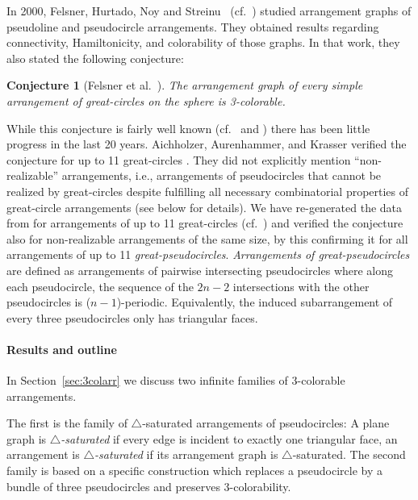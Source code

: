 \documentclass[fontsize=11pt,a4paper,DIV12]{scrartcl}
\newtheorem{conjecture}[theorem]{Conjecture}
\begin{document}
In 2000, Felsner, Hurtado, Noy and Streinu~\cite{FHNS2000} (cf.\
\cite{FelsnerHNS2006}) studied arrangement graphs of
pseudoline and pseudocircle arrangements. They obtained results regarding
connectivity, Hamiltonicity, and colorability of those graphs. In
that work, they also stated the following conjecture:

\begin{conjecture}[Felsner et al.\ \cite{FHNS2000,FelsnerHNS2006}]
  \label{conj:FHNS}
  The arrangement graph of every simple arrangement of great-circles on the sphere is
  3-colorable.
\end{conjecture}
      
While this conjecture is fairly well known (cf.\
\cite{OPG_website_3colorconj,Kalai_blog_coloring_problems,Wagon2002} and
\cite[Chapter~17.7]{Wagon2010book}) there has been little progress in the last
20 years.  Aichholzer, Aurenhammer, and Krasser verified the conjecture for up
to 11 great-circles \cite[Chapter~4.6.4]{Krasser2003}.  
They did not explicitly mention ``non-realizable'' arrangements, i.e., arrangements of pseudocircles that cannot be realized by great-circles despite fulfilling all necessary combinatorial properties of great-circle arrangements (see below for details).
We have re-generated the data from \cite[Chapter~4.6.4]{Krasser2003} for arrangements of up to 11
great-circles (cf.\ \cite{ScheucherSS2020}) and verified the conjecture also for
non-realizable arrangements of the same size, by this confirming it for all
arrangements of up to 11 \emph{great-pseudocircles}.
\emph{Arrangements of great-pseudocircles} are defined as arrangements of pairwise intersecting
pseudocircles where along each pseudocircle, the sequence
of the $2n-2$ intersections with the other pseudocircles is ($n-1$)-periodic.
Equivalently, the induced subarrangement of every three pseudocircles
only has triangular faces.  

\paragraph*{Results and outline}


In Section~\ref{sec:3colarr} we discuss two infinite families of
3-colorable arrangements.  

The first is the family of
$\triangle$-saturated arrangements of pseudocircles: A plane graph is \emph{$\triangle$-saturated} if  every edge is incident to exactly one triangular face, an arrangement is \emph{$\triangle$-saturated} if its arrangement graph is $\triangle$-saturated.
The second family is based on a specific construction which replaces a
pseudocircle by a bundle of three pseudocircles and preserves 3-colorability.
\end{document}
